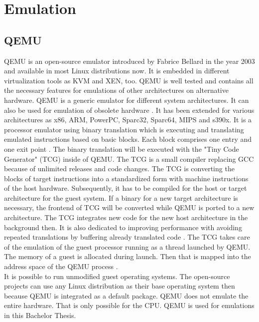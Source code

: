 
\chapter{Emulation}\label{ch:emulation}

\section{\gls{QEMU}}

\gls{QEMU} is an open-source emulator introduced by Fabrice Bellard in the year 2003 and available in most Linux distributions now. It is embedded in different virtualization tools as \gls{KVM} and \gls{XEN}, too. \gls{QEMU} is well tested and contains all the necessary features for emulations of other architectures on alternative hardware. 
\gls{QEMU} is a generic emulator for different system architectures. It can also be used for emulation of obsolete hardware \cite[~p.24]{Opsahl2013}. 
It has been extended for various architectures as x86, ARM, PowerPC, Sparc32, Sparc64, MIPS and s390x.
It is a processor emulator using binary translation \cite{Butt2011} which is executing and translating emulated instructions based on basic blocks. Each block comprises one entry and one exit point \cite[~p.5]{Wang2010}. 
The binary translation will be executed with the "Tiny Code Generator" (TCG) inside of \gls{QEMU}. 
The TCG is a small compiler replacing GCC because of unlimited releases and code changes. The TCG is converting the blocks of target instructions into a standardized form with machine instructions of the host hardware. 
Subsequently, it has to be compiled for the host or target architecture for the guest system. 
If a binary for a new target architecture is necessary, the frontend of TCG will be converted while \gls{QEMU} is ported to a new architecture. 
The TCG integrates new code for the new host architecture in the background then. It is also dedicated to improving performance with avoiding repeated translations by buffering already translated code \cite{Cota2017}. 
The TCG takes care of the emulation of the guest processor running as a thread launched by \gls{QEMU}. The memory of a guest is allocated during launch. Then that is mapped into the address space of the \gls{QEMU} process  \cite[~p.29]{Opsahl2013}.\\
It is possible to run unmodified guest operating systems. The open-source projects can use any Linux distribution as their base operating system then because \gls{QEMU} is integrated as a default package. 
\gls{QEMU} does not emulate the entire hardware. That is only possible for the CPU. \gls{QEMU} is used for emulations in this Bachelor Thesis.

